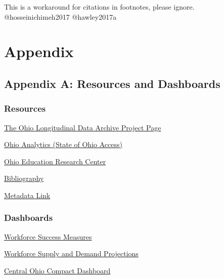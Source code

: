 \documentclass[
]{book}
\begin{document}
\begin{invisible}
This is a workaround for citations in footnotes, please ignore.
@hosseinichimeh2017 @hawley2017a
\end{invisible}

\hypertarget{appendix-2}{%
\section*{Appendix}\label{appendix-2}}

\hypertarget{appendix-a-resources-and-dashboards}{%
\subsection*{Appendix A: Resources and Dashboards}\label{appendix-a-resources-and-dashboards}}

\hypertarget{resources}{%
\subsubsection*{Resources}\label{resources}}

\href{https://chrr.osu.edu/projects/ohio-longitudinal-data-archive}{The Ohio Longitudinal Data Archive Project Page}

\href{http://www.ohioanalytics.gov/}{Ohio Analytics (State of Ohio Access)}

\href{https://oerc.osu.edu/}{Ohio Education Research Center}

\href{https://www.chrr.ohio-state.edu/content/olda_bib/olda_bib.html}{Bibliography}

\href{https://www.chrr.ohio-state.edu/investigator/pages/search}{Metadata Link}

\hypertarget{dashboards}{%
\subsubsection*{Dashboards}\label{dashboards}}

\href{https://workforcesuccess.chrr.ohio-state.edu/}{Workforce Success Measures}

\href{https://workforcedatatools.chrr.ohio-state.edu/home}{Workforce Supply and Demand Projections}

\href{https://compact.chrr.ohio-state.edu/}{Central Ohio Compact Dashboard}
\end{document}
